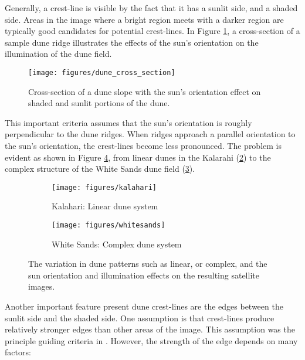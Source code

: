  Generally, a crest-line is visible by the fact that it has a sunlit side, and a shaded side. Areas in the image where a bright region meets with a darker region are typically good candidates for potential crest-lines. In Figure \ref{fig:dune_cross_section}, a cross-section of a sample dune ridge illustrates the effects of the sun's orientation on the illumination of the dune field.
 
 \begin{figure}
 	\centering
 	\texttt{[image: figures/dune\_cross\_section]}
 	\caption{Cross-section of a dune slope with the sun's orientation effect on shaded and sunlit portions of the dune.}
 	\label{fig:dune_cross_section}
 \end{figure}
 
 This important criteria assumes that the sun's orientation is roughly perpendicular to the dune ridges. When ridges approach a parallel orientation to the sun's orientation, the crest-lines become less pronounced. The problem is evident as shown in Figure \ref{fig:difference_between_dune_field_types}, from linear dunes in the Kalarahi (\ref{fig:difference_between_dune_field_types_kalahari}) to the complex structure of the White Sands dune field (\ref{fig:difference_between_dune_field_types_whitesands}).
 
 \begin{figure}
 	\centering
 	\begin{subfigure}{0.48\textwidth}
 		\centering
 		\texttt{[image: figures/kalahari]}
 		\caption{Kalahari: Linear dune system}
 		\label{fig:difference_between_dune_field_types_kalahari}
 	\end{subfigure}
 	\begin{subfigure}{0.48\textwidth}
 		\centering
 		\texttt{[image: figures/whitesands]}
 		\caption{White Sands: Complex dune system}
 		\label{fig:difference_between_dune_field_types_whitesands}
 	\end{subfigure}
 	
 	\caption{The variation in dune patterns such as  linear, or  complex, and the sun orientation and illumination effects on the resulting satellite images.}
 	\label{fig:difference_between_dune_field_types}
 \end{figure}
 
 Another important feature present dune crest-lines are the edges between the sunlit side and the shaded side. One assumption is that crest-lines produce relatively stronger edges than other areas of the image. This assumption was the principle guiding criteria in \cite{2015_automated_mapping_of_linear_dunefield}. However, the strength of the edge depends on many factors:
 
